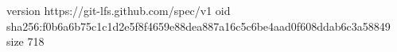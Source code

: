 version https://git-lfs.github.com/spec/v1
oid sha256:f0b6a6b75c1c1d2e5f8f4659e88dea887a16c5c6be4aad0f608ddab6c3a58849
size 718
